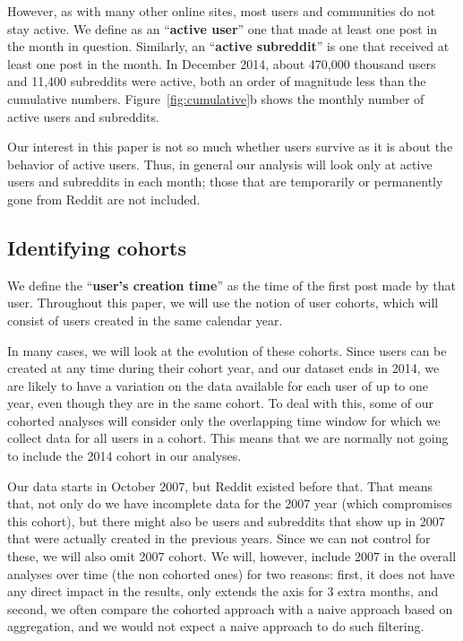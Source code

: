 However, as with many other online sites, most users \cite{Scellato2011,Hughes2009,Java2007} and communities \cite{Arguello2006} do not stay active. We define as an ``\textbf{active user}'' one that made at least one post in the month in question. Similarly, an ``\textbf{active subreddit}'' is one that received at least one post in the month. In December 2014, about 470,000 thousand users and 11,400 subreddits were active, both an order of magnitude less than the cumulative numbers. Figure~\ref{fig:cumulative}b shows the monthly number of active users and subreddits.

Our interest in this paper is not so much whether users survive as it is about the behavior of active users.  Thus, 
in general our analysis will look only at active users and subreddits in each month; those that are temporarily or permanently gone from Reddit are not included.  

\subsection{Identifying cohorts}

We define the ``\textbf{user's creation time}'' as the time of the first post made by that user.  Throughout this paper, we will use the notion of user cohorts, which will consist of users created in the same calendar year.

In many cases, we will look at the evolution of these cohorts. Since users can be created at any time during their cohort year, and our dataset ends in 2014, 
we are likely to have a variation on the data available for each user of up to one year, even though they are in the same cohort.  To deal with this, some of our cohorted analyses will consider only the overlapping time window for which we collect data for all users in a cohort.   This means that we are normally not going to include the 2014 cohort in our analyses.

Our data starts in October 2007, but Reddit existed before that. That means that, not only do we have incomplete data for the 2007 year (which compromises this cohort), but there might also be users and subreddits that show up in 2007 that were actually created in the previous years. Since we can not control for these, we will also omit 2007 cohort. We will, however, include 2007 in the overall analyses over time (the non cohorted ones) for two reasons: first, it does not have any direct impact in the results, only extends the axis for 3 extra months, and second, we often compare the cohorted approach with a naive approach based on aggregation, and we would not expect a naive approach to do such filtering. 
